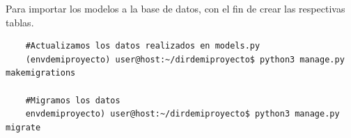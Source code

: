 Para importar los modelos a la base de datos, con el fin de crear las respectivas tablas.

\begin{verbatim}
	#Actualizamos los datos realizados en models.py
	(envdemiproyecto) user@host:~/dirdemiproyecto$ python3 manage.py makemigrations
	
	#Migramos los datos
	envdemiproyecto) user@host:~/dirdemiproyecto$ python3 manage.py migrate
\end{verbatim}



